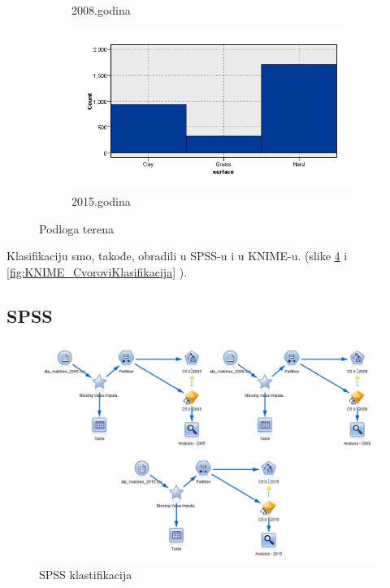 \documentclass[a4paper]{article}
\begin{document}
\begin{figure}[H]
\begin{subfigure}[h]{0.37\textwidth}
\begin{center}
		\end{center}
		\caption{2008.godina}
		\label{fig:Podloga2008}
	\end{subfigure}
	\hfill
	\begin{subfigure}[h]{\textwidth}
		\begin{center}
			\includegraphics[scale=0.40]{Klasifikacija/HistogramiPodlogaTerena/Graphboard2015.png}
		\end{center}
		\caption{2015.godina}
		\label{fig:Podloga2015}
	\end{subfigure}
	
	\caption{Podloga terena}
	\label{fig:Podloga}
\end{figure} 

Klasifikaciju smo, takođe, obradili u SPSS-u i u KNIME-u. (slike \ref{fig:SPSS_CvoroviKlasifikacija} i \ref{fig:KNIME_CvoroviKlasifikacija} ). 

\subsection{SPSS}

\begin{figure}[H]
	\begin{center}
		\includegraphics[scale=0.60]{Klasifikacija/C50/SPSS_C50_Surface.png}
	\end{center}
	\caption{SPSS klastifikacija}
	\label{fig:SPSS_CvoroviKlasifikacija}
\end{figure}
\end{document}
